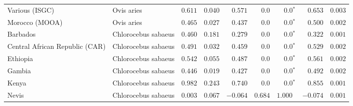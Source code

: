 \begin{center}
\begin{adjustbox}{width = 1\textwidth}
\begin{tabular}{|l|l|r|r|r|r|r|r|r|}
                 Various (ISGC) &           Ovis aries &                                        $ 0.611$ &                                           $ 0.040$ &                      $ 0.571$ &            $0.0$ &                  $\bm{0.0{^*}}$ &                                           $ 0.653$ &           $ 0.003$ \\
                 Morocco (MOOA) &           Ovis aries &                                        $ 0.465$ &                                           $ 0.027$ &                      $ 0.437$ &            $0.0$ &                  $\bm{0.0{^*}}$ &                                           $ 0.500$ &           $ 0.002$ \\
                       Barbados &  Chlorocebus sabaeus &                                        $ 0.460$ &                                           $ 0.181$ &                      $ 0.279$ &            $0.0$ &                  $\bm{0.0{^*}}$ &                                           $ 0.322$ &           $ 0.001$ \\
 Central African Republic (CAR) &  Chlorocebus sabaeus &                                        $ 0.491$ &                                           $ 0.032$ &                      $ 0.459$ &            $0.0$ &                  $\bm{0.0{^*}}$ &                                           $ 0.529$ &           $ 0.002$ \\
                       Ethiopia &  Chlorocebus sabaeus &                                        $ 0.542$ &                                           $ 0.055$ &                      $ 0.487$ &            $0.0$ &                  $\bm{0.0{^*}}$ &                                           $ 0.561$ &           $ 0.002$ \\
                         Gambia &  Chlorocebus sabaeus &                                        $ 0.446$ &                                           $ 0.019$ &                      $ 0.427$ &            $0.0$ &                  $\bm{0.0{^*}}$ &                                           $ 0.492$ &           $ 0.002$ \\
                          Kenya &  Chlorocebus sabaeus &                                        $ 0.982$ &                                           $ 0.243$ &                      $ 0.740$ &            $0.0$ &                  $\bm{0.0{^*}}$ &                                           $ 0.855$ &           $ 0.001$ \\
                          Nevis &  Chlorocebus sabaeus &                                        $ 0.003$ &                                           $ 0.067$ &                      $-0.064$ &         $ 0.684$ &                      $ 1.000~~$ &                                           $-0.074$ &           $ 0.001$ \\

\end{tabular}
\end{adjustbox}
\end{center}
